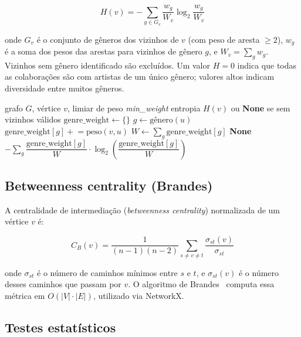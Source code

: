 \documentclass[12pt,a4paper]{article}
\begin{document}
\begin{equation}
    H(v) = -\sum_{g \in G_v} \frac{w_g}{W_v} \log_2 \frac{w_g}{W_v}
    \label{eq:shannon}
\end{equation}

onde $G_v$ é o conjunto de gêneros dos vizinhos de $v$ (com peso de aresta $\geq 2$), $w_g$ é a soma dos pesos das arestas para vizinhos de gênero $g$, e $W_v = \sum_g w_g$. Vizinhos sem gênero identificado são excluídos. Um valor $H = 0$ indica que todas as colaborações são com artistas de um único gênero; valores altos indicam diversidade entre muitos gêneros.

\begin{algorithm}[H]
\caption{Cálculo da entropia de Shannon para um vértice $v$}
\begin{algorithmic}[1]
\Require grafo $G$, vértice $v$, limiar de peso \textit{min\_weight}
\Ensure entropia $H(v)$ ou \textbf{None} se sem vizinhos válidos
\State $\text{genre\_weight} \gets \{\}$
    \State $g \gets \text{gênero}(u)$
        \State $\text{genre\_weight}[g] \mathrel{+}= \text{peso}(v, u)$
    \EndIf
\EndFor
\State $W \gets \sum_g \text{genre\_weight}[g]$
 \Return \textbf{None} \EndIf
\Return $-\sum_g \dfrac{\text{genre\_weight}[g]}{W} \cdot \log_2\!\left(\dfrac{\text{genre\_weight}[g]}{W}\right)$
\end{algorithmic}
\end{algorithm}

\subsection{Betweenness centrality (Brandes)}

A centralidade de intermediação (\emph{betweenness centrality}) normalizada de um vértice $v$ é:

\begin{equation}
    C_B(v) = \frac{1}{(n-1)(n-2)} \sum_{s \neq v \neq t} \frac{\sigma_{st}(v)}{\sigma_{st}}
\end{equation}

onde $\sigma_{st}$ é o número de caminhos mínimos entre $s$ e $t$, e $\sigma_{st}(v)$ é o número desses caminhos que passam por $v$. O algoritmo de Brandes~\cite{brandes2001} computa essa métrica em $O(|V| \cdot |E|)$, utilizado via NetworkX.

\subsection{Testes estatísticos}
\end{document}

